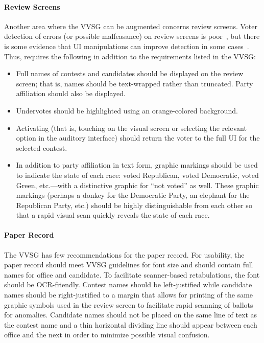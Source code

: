 \paragraph{Review Screens}
Another area where the VVSG can be augmented concerns review screens. 
Voter detection of errors (or possible malfeasance) on review screens is poor~\cite{everett07thesis}, but there is some evidence that UI manipulations can improve detection in some cases~\cite{campbell-evt09}. Thus, \projname  requires the following in addition to the requirements listed in the VVSG:
\begin{itemize}
\item  Full names of contests and candidates should be displayed on the review screen; 
that is, names should be text-wrapped rather than truncated. 
Party affiliation should also be displayed.
\item Undervotes should be highlighted using an orange-colored background. 
\item Activating (that is, touching on the visual screen or selecting the relevant option in the auditory interface) should return the voter to the full UI for the selected contest.
\item In addition to party affiliation in text form, graphic markings should be used to indicate the state of each race: voted Republican, voted Democratic, voted Green, etc.---with a distinctive graphic for ``not voted'' as well. These graphic markings (perhaps a donkey for the Democratic Party, an elephant for the Republican Party, etc.) should be highly distinguishable from each other so that a rapid visual scan quickly reveals the state of each race.
\end{itemize}

\paragraph{Paper Record}
The VVSG has few recommendations for the paper record. For usability, the paper record should meet VVSG guidelines for font size and should contain full names for office and candidate. 
To facilitate scanner-based retabulations, the font should be OCR-friendly. 
Contest names should be left-justified while candidate names should be right-justified 
to a margin that allows for printing of the same graphic symbols used in the review screen to facilitate rapid scanning of ballots for anomalies. 
Candidate names should not be placed on the same line of text as the contest name and a thin horizontal dividing line should appear between each office and the next in order to minimize possible visual confusion.

